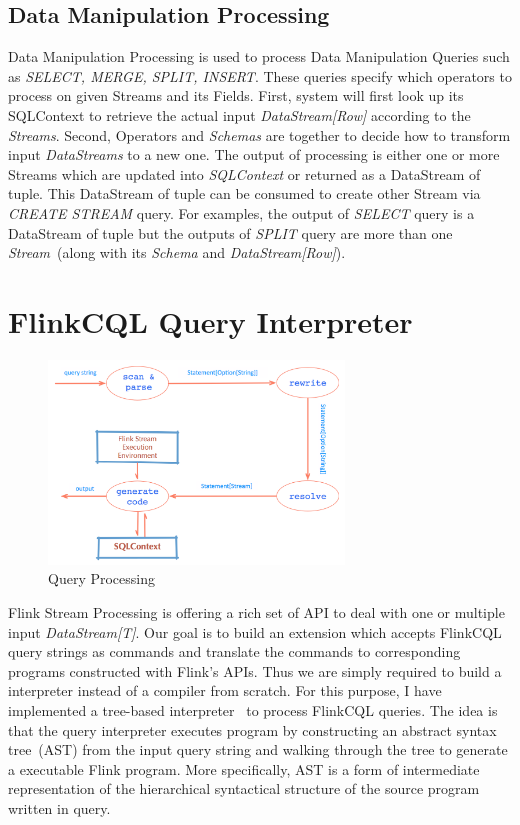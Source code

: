 \subsection{Data Manipulation Processing}
Data Manipulation Processing is used to process Data Manipulation Queries such as \textit{SELECT, MERGE, SPLIT, INSERT}. These queries specify which operators to process on given Streams and its Fields. First, system will first look up its SQLContext to retrieve the actual input \textit{DataStream[Row]} according to the \textit{Streams}. Second, Operators and \textit{Schemas} are together to decide how to transform input \textit{DataStreams} to a new one. The output of processing is either one or more Streams which are updated into \textit{SQLContext} or returned as a DataStream of tuple. This DataStream of tuple can be consumed to create other Stream via \textit{CREATE STREAM} query. For examples, the output of \textit{SELECT} query is a DataStream of tuple but the outputs of \textit{SPLIT} query are more than one \textit{Stream}~(along with its \textit{Schema} and \textit{DataStream[Row]}).

\section{FlinkCQL Query Interpreter}
\begin{figure}[h!] 
\centering    
\includegraphics[width=0.7\textwidth]{QueryProcessing}
\caption{Query Processing}
\label{fig:QueryProcessing}
\end{figure}


Flink Stream Processing is offering a rich set of API to deal with one or  multiple input \textit{DataStream[T]}. Our goal is to build an extension which accepts FlinkCQL query strings as commands and translate the commands to  corresponding programs constructed with Flink's APIs. Thus we are simply required to build a interpreter instead of a compiler from scratch. For this purpose, I have implemented a tree-based interpreter~\citep{Parr:2009} to process FlinkCQL queries. The idea is that the query interpreter executes program by constructing an abstract syntax tree~(AST) from the input query string and walking through the tree to generate a executable Flink program. More specifically, AST is a form of intermediate representation of the hierarchical syntactical structure of the source program written in query.  
	

